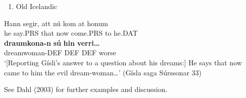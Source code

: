 \begin{enumerate} %
\item 
Old Icelandic

\end{enumerate} %
\ea\label{}
\gll Hann  segir,  att  nú  kom  at  honum\\


he  say.PRS   that  now  come.PRS  to  he.DAT\\ %


\ea\label{}
\gll \textbf{draumkona}\textbf{{}-n}\textbf{  sú} \textbf{hin} \textbf{verri…}\\


dreamwoman-DEF  DEF  DEF  worse\\ %


‘[Reporting Gísli’s answer to a question about his dreams:] He says that now came to him the evil dream-woman…’ (Gísla saga Súrssonar 33)
\z


 See Dahl (2003) for further examples and discussion.

